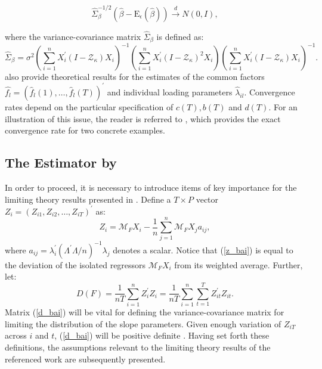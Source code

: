 $$\hat{\Sigma}_\beta^{-1 / 2}\left(\hat{\beta}-\mathrm{E}_\epsilon(\hat{\beta})\right) \stackrel{d}{\rightarrow} N(0, I),$$

where the variance-covariance matrix $\hat{\Sigma}_\beta$ is defined as:
\begin{equation*}
    \hat{\Sigma}_\beta=\sigma^2\left(\sum_{i=1}^n X_i^{\prime}\left(I-\mathcal{Z}_\kappa\right) X_i\right)^{-1}\left(\sum_{i=1}^n X_i^{\prime}\left(I-\mathcal{Z}_\kappa\right)^2 X_i\right)\left(\sum_{i=1}^n X_i^{\prime}\left(I-\mathcal{Z}_\kappa\right) X_i\right)^{-1} .
\end{equation*}
\citet{kneip2012new} also provide theoretical results for the estimates of the common factors $\hat{f_l} = (\hat{f}_l(1), \ldots, \hat{f}_l(T))^\prime$ and individual loading parameters $\hat{\lambda}_{il}$. Convergence rates depend on the particular specification of $c(T), b(T)$ and $d(T)$. For an illustration of this issue, the reader is referred to \citet{kneip2012new}, which provides the exact convergence rate for two concrete examples. 




\subsection{The Estimator by \citet{bai2009panel}}\label{bai}


In order to proceed, it is necessary to introduce items of key importance for the limiting theory results presented in \citet{bai2009panel}. Define a $T \times P$ vector $Z_i=\left(Z_{i 1}, Z_{i 2}, \ldots, Z_{i T}\right)^{\prime}$ as:
\begin{equation}\label{z_bai}
    Z_i=\mathcal{M}_F X_i-\frac{1}{n} \sum_{j=1}^n \mathcal{M}_F X_j a_{i j},
\end{equation}
where $a_{i j}=\lambda_i^{\prime}\left(\Lambda^{\prime} \Lambda / n\right)^{-1} \lambda_j$ denotes a scalar. Notice that  (\ref{z_bai}) is equal to the deviation of the isolated regressors $\mathcal{M}_F X_i$ from its weighted average.  Further, let:
\begin{equation}\label{d_bai}
    D(F)=\frac{1}{n T} \sum_{i=1}^n Z_i^{\prime} Z_i = \frac{1}{n T} \sum_{i=1}^n \sum_{t=1}^T Z_{i t}^{\prime} Z_{i t}.
\end{equation}
Matrix (\ref{d_bai}) will be vital for defining the variance-covariance matrix for limiting the distribution of the slope parameters. Given enough variation of $Z_{i T}$ across $i$ and $t$, (\ref{d_bai}) will be positive definite \citep{bai2009panel}.  Having set forth these definitions, the assumptions relevant to the limiting theory results of the referenced work are subsequently presented. 

